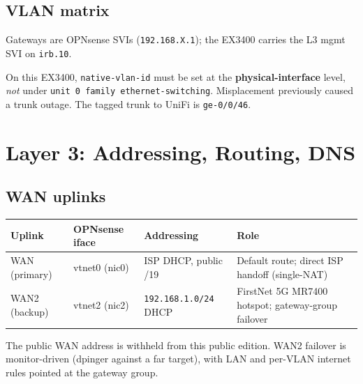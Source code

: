 \documentclass[11pt,letterpaper]{article}
\newcommand{\ip}[1]{\texttt{#1}}
\begin{document}
\subsection{VLAN matrix}
\begin{center}
\end{center}
Gateways are OPNsense SVIs (\ip{192.168.X.1}); the EX3400 carries the L3 mgmt SVI on \texttt{irb.10}.
\begin{note}
On this EX3400, \texttt{native-vlan-id} must be set at the \textbf{physical-interface} level, \emph{not} under \texttt{unit 0 family ethernet-switching}. Misplacement previously caused a trunk outage. The tagged trunk to UniFi is \texttt{ge-0/0/46}.
\end{note}

\section{Layer 3: Addressing, Routing, DNS}
\subsection{WAN uplinks}
\begin{center}\footnotesize
\begin{tabularx}{\textwidth}{@{}l l l X@{}}
\toprule Uplink & OPNsense iface & Addressing & Role \\ \midrule
WAN (primary) & vtnet0 (nic0) & ISP DHCP, public /19 & Default route; direct ISP handoff (single-NAT) \\
WAN2 (backup) & vtnet2 (nic2) & \ip{192.168.1.0/24} DHCP & FirstNet 5G MR7400 hotspot; gateway-group failover \\
\bottomrule
\end{tabularx}
\end{center}
The public WAN address is withheld from this public edition. WAN2 failover is monitor-driven (dpinger against a far target), with LAN and per-VLAN internet rules pointed at the gateway group.
\end{document}
